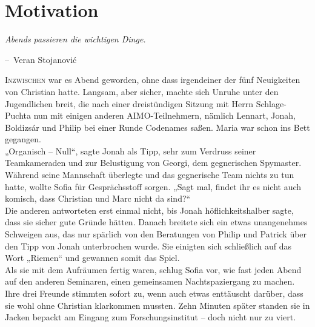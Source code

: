 \documentclass[oneside]{memoir}
\makeatletter
\newenvironment{chapquote}[2][2em]
  {\setlength{\@tempdima}{#1}%
   \def\chapquote@author{#2}%
   \parshape 1 \@tempdima \dimexpr\textwidth-2\@tempdima\relax%
   \itshape}
  {\par\normalfont\hfill--\ \chapquote@author\hspace*{\@tempdima}\par\bigskip}
\makeatother
\begin{document}
\chapter{Motivation} %
\begin{chapquote}{Veran Stojanović}
\glqq Abends passieren die wichtigen Dinge.\grqq
\end{chapquote}

\lettrine{I}{nzwischen} war es Abend geworden, ohne dass irgendeiner der fünf Neuigkeiten von Christian hatte. Langsam, aber sicher, machte sich Unruhe unter den Jugendlichen breit, die nach einer dreistündigen Sitzung mit Herrn Schlage-Puchta nun mit einigen anderen AIMO-Teilnehmern, nämlich Lennart, Jonah, Boldizsár und Philip bei einer Runde Codenames saßen. Maria war schon ins Bett gegangen. \\
„Organisch – Null“, sagte Jonah als Tipp, sehr zum Verdruss seiner Teamkameraden und zur Belustigung von Georgi, dem gegnerischen Spymaster. \\
Während seine Mannschaft überlegte und das gegnerische Team nichts zu tun hatte, wollte Sofia für Gesprächsstoff sorgen. „Sagt mal, findet ihr es nicht auch komisch, dass Christian und Marc nicht da sind?“ \\
Die anderen antworteten erst einmal nicht, bis Jonah höflichkeitshalber sagte, dass sie sicher gute Gründe hätten. Danach breitete sich ein etwas unangenehmes Schweigen aus, das nur spärlich von den Beratungen von Philip und Patrick über den Tipp von Jonah unterbrochen wurde. Sie einigten sich schließlich auf das Wort „Riemen“ und gewannen somit das Spiel. \\
Als sie mit dem Aufräumen fertig waren, schlug Sofia vor, wie fast jeden Abend auf den anderen Seminaren, einen gemeinsamen Nachtspaziergang zu machen. Ihre drei Freunde stimmten sofort zu, wenn auch etwas enttäuscht darüber, dass sie wohl ohne Christian klarkommen mussten. Zehn Minuten später standen sie in Jacken bepackt am Eingang zum Forschungsinstitut – doch nicht nur zu viert. \\
\end{document}
